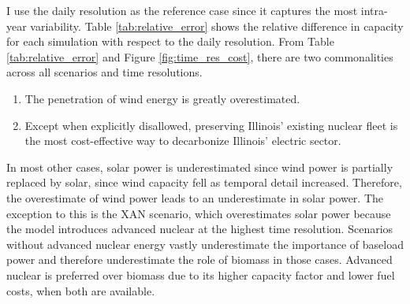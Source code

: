 I use the daily resolution as the reference case since it captures the most
intra-year variability.
Table \ref{tab:relative_error} shows the relative difference in capacity for each
simulation with respect to the daily resolution. From Table \ref{tab:relative_error}
and Figure \ref{fig:time_res_cost}, there are two commonalities across all scenarios
and time resolutions.
\begin{enumerate}
  \item The penetration of wind energy is greatly overestimated.
  \item Except when explicitly disallowed, preserving Illinois' existing nuclear
  fleet is the most cost-effective way to decarbonize Illinois' electric sector.
\end{enumerate}
In most other cases, solar power is underestimated since wind power is partially
replaced by solar, since wind capacity fell as temporal detail increased. Therefore,
the overestimate of wind power leads to an underestimate in
solar power. The exception to this is the \gls{XAN} scenario, which overestimates
solar power because the model introduces advanced nuclear at the highest time resolution.
Scenarios without advanced nuclear energy vastly underestimate the importance of
baseload power and therefore underestimate the role of biomass in those cases.
Advanced nuclear is preferred over biomass due to its higher capacity factor and
lower fuel costs, when both are available.

